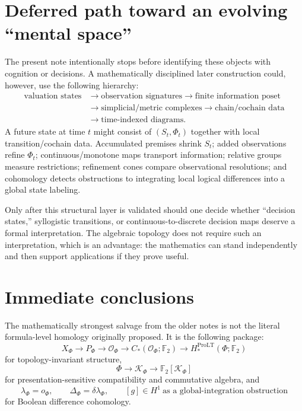 \documentclass[11pt]{article}
\theoremstyle{definition}
\newcommand{\F}{\mathbb F_2}
\newcommand{\OX}{\mathcal O}
\newcommand{\K}{\mathcal K}
\begin{document}
\section{Deferred path toward an evolving ``mental space''}

The present note intentionally stops before identifying these objects with cognition or decisions. A mathematically disciplined later construction could, however, use the following hierarchy:
\[
\begin{aligned}
\text{valuation states}
&\longrightarrow\text{observation signatures}
\longrightarrow\text{finite information poset}\\
&\longrightarrow\text{simplicial/metric complexes}
\longrightarrow\text{chain/cochain data}\\
&\longrightarrow\text{time-indexed diagrams}.
\end{aligned}
\]
A future state at time $t$ might consist of $(S_t,\Phi_t)$ together with local transition/cochain data. Accumulated premises shrink $S_t$; added observations refine $\Phi_t$; continuous/monotone maps transport information; relative groups measure restrictions; refinement cones compare observational resolutions; and cohomology detects obstructions to integrating local logical differences into a global state labeling.

Only after this structural layer is validated should one decide whether ``decision states,'' syllogistic transitions, or continuous-to-discrete decision maps deserve a formal interpretation. The algebraic topology does not require such an interpretation, which is an advantage: the mathematics can stand independently and then support applications if they prove useful.

\section{Immediate conclusions}

The mathematically strongest salvage from the older notes is not the literal formula-level homology originally proposed. It is the following package:
\[
\boxed{
X_\Phi
\longrightarrow P_\Phi
\longrightarrow\OX_\Phi
\longrightarrow C_*(\OX_\Phi;\F)
\longrightarrow H_*^{\mathrm{ProLT}}(\Phi;\F)
}
\]
for topology-invariant structure,
\[
\boxed{
\Phi\longrightarrow\K_\Phi\longrightarrow \F[\K_\Phi]
}
\]
for presentation-sensitive compatibility and commutative algebra, and
\[
\boxed{
\lambda_\Phi=o_\Phi,
\qquad
\Delta_\Phi=\delta\lambda_\Phi,
\qquad
[g]\in H^1\ \text{as a global-integration obstruction}
}
\]
for Boolean difference cohomology.
\end{document}
